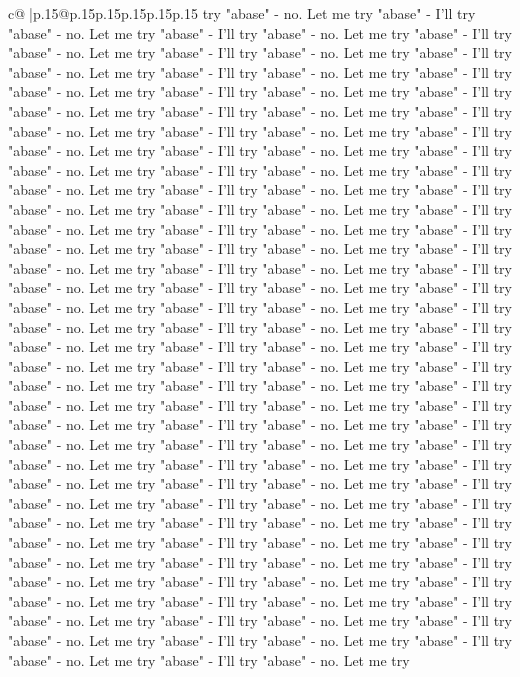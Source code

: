 \documentclass{article}
\begin{document}
{\begin{supertabular}{c@{$\;$}|p{.15\linewidth}@{}p{.15\linewidth}p{.15\linewidth}p{.15\linewidth}p{.15\linewidth}p{.15\linewidth}}
{{{try "abase" {-} no. Let me try "abase" {-} I'll try "abase" {-} no. Let me try "abase" {-} I'll try "abase" {-} no. Let me try "abase" {-} I'll try "abase" {-} no. Let me try "abase" {-} I'll try "abase" {-} no. Let me try "abase" {-} I'll try "abase" {-} no. Let me try "abase" {-} I'll try "abase" {-} no. Let me try "abase" {-} I'll try "abase" {-} no. Let me try "abase" {-} I'll try "abase" {-} no. Let me try "abase" {-} I'll try "abase" {-} no. Let me try "abase" {-} I'll try "abase" {-} no. Let me try "abase" {-} I'll try "abase" {-} no. Let me try "abase" {-} I'll try "abase" {-} no. Let me try "abase" {-} I'll try "abase" {-} no. Let me try "abase" {-} I'll try "abase" {-} no. Let me try "abase" {-} I'll try "abase" {-} no. Let me try "abase" {-} I'll try "abase" {-} no. Let me try "abase" {-} I'll try "abase" {-} no. Let me try "abase" {-} I'll try "abase" {-} no. Let me try "abase" {-} I'll try "abase" {-} no. Let me try "abase" {-} I'll try "abase" {-} no. Let me try "abase" {-} I'll try "abase" {-} no. Let me try "abase" {-} I'll try "abase" {-} no. Let me try "abase" {-} I'll try "abase" {-} no. Let me try "abase" {-} I'll try "abase" {-} no. Let me try "abase" {-} I'll try "abase" {-} no. Let me try "abase" {-} I'll try "abase" {-} no. Let me try "abase" {-} I'll try "abase" {-} no. Let me try "abase" {-} I'll try "abase" {-} no. Let me try "abase" {-} I'll try "abase" {-} no. Let me try "abase" {-} I'll try "abase" {-} no. Let me try "abase" {-} I'll try "abase" {-} no. Let me try "abase" {-} I'll try "abase" {-} no. Let me try "abase" {-} I'll try "abase" {-} no. Let me try "abase" {-} I'll try "abase" {-} no. Let me try "abase" {-} I'll try "abase" {-} no. Let me try "abase" {-} I'll try "abase" {-} no. Let me try "abase" {-} I'll try "abase" {-} no. Let me try "abase" {-} I'll try "abase" {-} no. Let me try "abase" {-} I'll try "abase" {-} no. Let me try "abase" {-} I'll try "abase" {-} no. Let me try "abase" {-} I'll try "abase" {-} no. Let me try "abase" {-} I'll try "abase" {-} no. Let me try "abase" {-} I'll try "abase" {-} no. Let me try "abase" {-} I'll try "abase" {-} no. Let me try "abase" {-} I'll try "abase" {-} no. Let me try "abase" {-} I'll try "abase" {-} no. Let me try "abase" {-} I'll try "abase" {-} no. Let me try "abase" {-} I'll try "abase" {-} no. Let me try "abase" {-} I'll try "abase" {-} no. Let me try "abase" {-} I'll try "abase" {-} no. Let me try "abase" {-} I'll try "abase" {-} no. Let me try "abase" {-} I'll try "abase" {-} no. Let me try "abase" {-} I'll try "abase" {-} no. Let me try "abase" {-} I'll try "abase" {-} no. Let me try "abase" {-} I'll try "abase" {-} no. Let me try "abase" {-} I'll try "abase" {-} no. Let me try "abase" {-} I'll try "abase" {-} no. Let me try "abase" {-} I'll try "abase" {-} no. Let me try "abase" {-} I'll try "abase" {-} no. Let me try "abase" {-} I'll try "abase" {-} no. Let me try "abase" {-} I'll try "abase" {-} no. Let me try "abase" {-} I'll try "abase" {-} no. Let me try "abase" {-} I'll try "abase" {-} no. Let me try "abase" {-} I'll try "abase" {-} no. Let me try "abase" {-} I'll try "abase" {-} no. Let me try "abase" {-} I'll try "abase" {-} no. Let me try }}}
\end{supertabular}}
\end{document}
